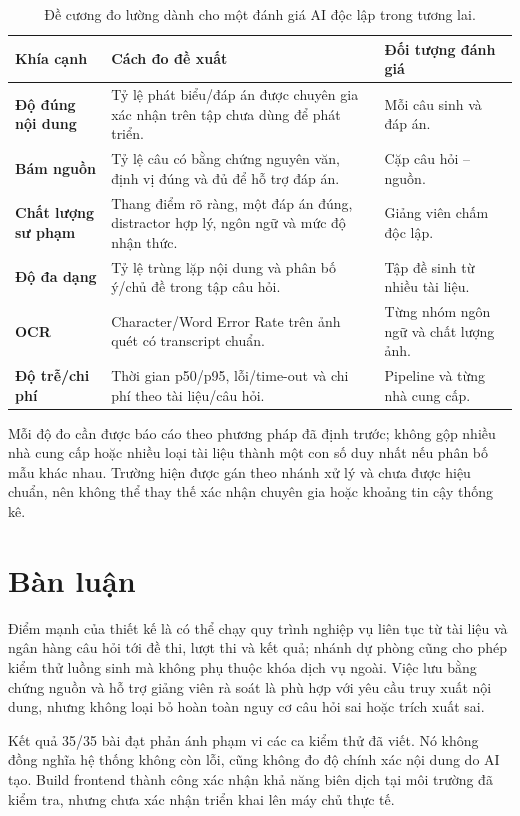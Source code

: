 \begin{table}[H]
\centering
\caption{Đề cương đo lường dành cho một đánh giá AI độc lập trong tương lai.}
\label{tab:ai-eval-plan}
\begin{tabularx}{\textwidth}{>{\bfseries\color{daunavy}}p{} X X}
\toprule
\rowcolor{gray100}Khía cạnh & Cách đo đề xuất & Đối tượng đánh giá \\
\midrule
Độ đúng nội dung & Tỷ lệ phát biểu/đáp án được chuyên gia xác nhận trên tập chưa dùng để phát triển. & Mỗi câu sinh và đáp án. \\
Bám nguồn & Tỷ lệ câu có bằng chứng nguyên văn, định vị đúng và đủ để hỗ trợ đáp án. & Cặp câu hỏi -- nguồn. \\
Chất lượng sư phạm & Thang điểm rõ ràng, một đáp án đúng, distractor hợp lý, ngôn ngữ và mức độ nhận thức. & Giảng viên chấm độc lập. \\
Độ đa dạng & Tỷ lệ trùng lặp nội dung và phân bố ý/chủ đề trong tập câu hỏi. & Tập đề sinh từ nhiều tài liệu. \\
OCR & Character/Word Error Rate trên ảnh quét có transcript chuẩn. & Từng nhóm ngôn ngữ và chất lượng ảnh. \\
Độ trễ/chi phí & Thời gian p50/p95, lỗi/time-out và chi phí theo tài liệu/câu hỏi. & Pipeline và từng nhà cung cấp. \\
\bottomrule
\end{tabularx}
\end{table}

Mỗi độ đo cần được báo cáo theo phương pháp đã định trước; không gộp nhiều
nhà cung cấp hoặc nhiều loại tài liệu thành một con số duy nhất nếu phân bố
mẫu khác nhau. Trường  hiện được gán theo nhánh xử lý và
chưa được hiệu chuẩn, nên không thể thay thế xác nhận chuyên gia hoặc
khoảng tin cậy thống kê.

\section{Bàn luận}

Điểm mạnh của thiết kế là có thể chạy quy trình nghiệp vụ liên tục từ tài
liệu và ngân hàng câu hỏi tới đề thi, lượt thi và kết quả; nhánh dự phòng
cũng cho phép kiểm thử luồng sinh mà không phụ thuộc khóa dịch vụ ngoài.
Việc lưu bằng chứng nguồn và hỗ trợ giảng viên rà soát là phù hợp với yêu
cầu truy xuất nội dung, nhưng không loại bỏ hoàn toàn nguy cơ câu hỏi sai
hoặc trích xuất sai.

Kết quả 35/35 bài đạt phản ánh phạm vi các ca kiểm thử đã viết. Nó không
đồng nghĩa hệ thống không còn lỗi, cũng không đo độ chính xác nội dung do
AI tạo. Build frontend thành công xác nhận khả năng biên dịch tại môi trường
đã kiểm tra, nhưng chưa xác nhận triển khai lên máy chủ thực tế.

